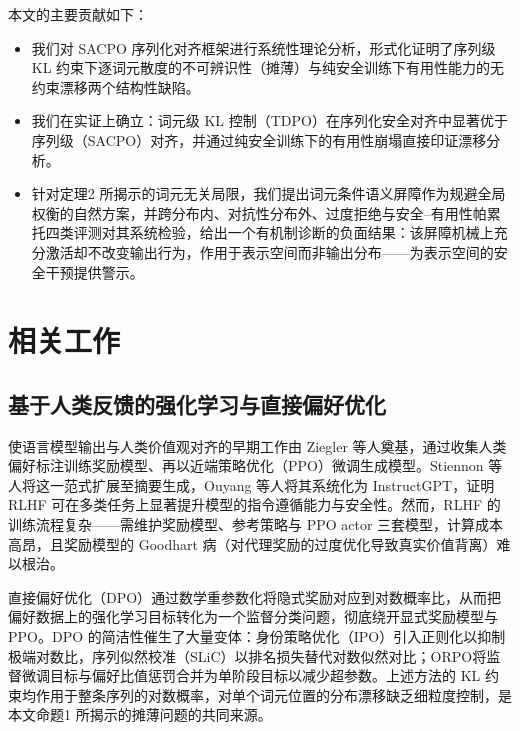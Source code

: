 \documentclass[lettersize,journal]{IEEEtran}
\begin{document}
本文的主要贡献如下：
\begin{itemize}
    \item 我们对 SACPO 序列化对齐框架进行系统性理论分析，形式化证明了序列级 KL 约束下逐词元散度的不可辨识性（摊薄）与纯安全训练下有用性能力的无约束漂移两个结构性缺陷。

    \item 我们在实证上确立：词元级 KL 控制（TDPO）在序列化安全对齐中显著优于序列级（SACPO）对齐，并通过纯安全训练下的有用性崩塌直接印证漂移分析。

    \item 针对定理2 所揭示的词元无关局限，我们提出词元条件语义屏障作为规避全局权衡的自然方案，并跨分布内、对抗性分布外、过度拒绝与安全–有用性帕累托四类评测对其系统检验，给出一个有机制诊断的负面结果：该屏障机械上充分激活却不改变输出行为，作用于表示空间而非输出分布——为表示空间的安全干预提供警示。
\end{itemize}

\section{相关工作}

\subsection{基于人类反馈的强化学习与直接偏好优化}

使语言模型输出与人类价值观对齐的早期工作由 Ziegler 等人\cite{ziegler2019fine}奠基，通过收集人类偏好标注训练奖励模型、再以近端策略优化（PPO）\cite{schulman2017proximal}微调生成模型。Stiennon 等人\cite{stiennon2020learning}将这一范式扩展至摘要生成，Ouyang 等人\cite{ouyang2022training}将其系统化为 InstructGPT，证明 RLHF 可在多类任务上显著提升模型的指令遵循能力与安全性。然而，RLHF 的训练流程复杂——需维护奖励模型、参考策略与 PPO actor 三套模型，计算成本高昂，且奖励模型的 Goodhart 病（对代理奖励的过度优化导致真实价值背离）难以根治\cite{gao2023scaling}。

直接偏好优化（DPO）\cite{rafailov2023direct}通过数学重参数化将隐式奖励对应到对数概率比，从而把偏好数据上的强化学习目标转化为一个监督分类问题，彻底绕开显式奖励模型与 PPO。DPO 的简洁性催生了大量变体：身份策略优化（IPO）\cite{azar2024general}引入正则化以抑制极端对数比，序列似然校准（SLiC）\cite{zhao2023slic}以排名损失替代对数似然对比；ORPO\cite{hong2024orpo}将监督微调目标与偏好比值惩罚合并为单阶段目标以减少超参数。上述方法的 KL 约束均作用于整条序列的对数概率，对单个词元位置的分布漂移缺乏细粒度控制，是本文命题1 所揭示的摊薄问题的共同来源。
\end{document}
